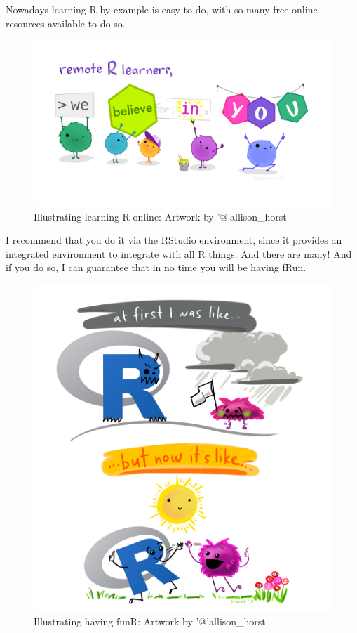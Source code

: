 \documentclass[
]{article}
\begin{document}
Nowadays learning R by example is easy to do, with so many free online
resources available to do so.

\begin{figure}
\centering
\includegraphics{extfiles/monster_support.jpg}
\caption{Illustrating learning R online: Artwork by '@'allison\_horst}
\end{figure}

I recommend that you do it via the RStudio environment, since it
provides an integrated environment to integrate with all R things. And
there are many! And if you do so, I can guarantee that in no time you
will be having fRun.

\begin{figure}
\centering
\includegraphics{extfiles/r_first_then.png}
\caption{Illustrating having funR: Artwork by '@'allison\_horst}
\end{figure}
\end{document}

